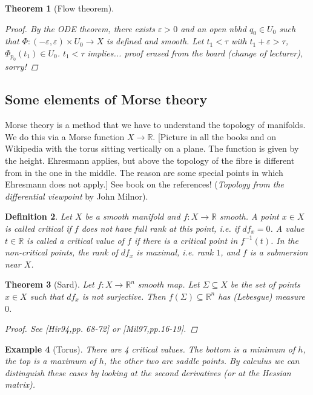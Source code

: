 \documentclass[12pt]{article}
\theoremstyle{darkgreentheorem}
\newtheorem{thm}{Theorem}[section]
\theoremstyle{darkbluedefinition}
\newtheorem{defn}[thm]{Definition}
\theoremstyle{darkredexample}
\newtheorem{exa}[thm]{Example}
\theoremstyle{remark}
\newcommand{\R}{\mathbb{R}}
\newcommand{\1}{\mathbbm{1}}
\newcommand{\tms}{\times}
\newcommand{\sub}{\subseteq}
\begin{document}
\begin{thm}[Flow theorem]
\begin{proof}
	By the ODE theorem, there exists $\varepsilon >0$ and an open nbhd $q_{0}\in U_{0}$ such that $\Phi\colon (-\varepsilon, \varepsilon)\tms U_{0}\to X$ is defined and smooth.
	Let $t_{1}<\tau$ with $t_{1}+\varepsilon >\tau$, $\Phi_{p_{0}}(t_{1})\in U_{0}$.
	$t_{1}<\tau$ implies... proof erased from the board (change of lecturer), sorry!
    \end{proof}
\end{thm}

\subsection{Some elements of Morse theory}

Morse theory is a method that we have to understand the topology of manifolds.
We do this via a Morse function $X\to \R$.
[Picture in all the books and on Wikipedia with the torus sitting vertically on a plane.
The function is given by the height.
Ehresmann applies, but above the topology of the fibre is different from in the one in the middle.
The reason are some special points in which Ehresmann does not apply.]
See book on the references! (\textit{Topology from the differential viewpoint} by John Milnor).

\begin{defn}
    Let $X$ be a smooth manifold and $f\colon X\to \R$ smooth.
    A point $x\in X$ is called \textit{critical} if $f$ does not have full rank at this point, i.e. if $df_{x}=0$.
    A value $t\in \R$ is called a \textit{critical value} of $f$ if there is a critical point in $f^{-1}(t)$.
    In the non-critical points, the rank of $df_{x}$ is maximal, i.e. rank $1$, and $f$ is a submersion near $X$.
\end{defn}

\begin{thm}[Sard]
    Let $f\colon X\to \R^{n}$ smooth map.
    Let $\Sigma\sub X$ be the set of points $x\in X$ such that $df_{x}$ is not surjective.
    Then $f(\Sigma)\sub \R^{n}$ has (Lebesgue) measure $0$.
    \begin{proof}
	See [Hir94,pp. 68-72] or [Mil97,pp.16-19].
    \end{proof}
\end{thm}

\begin{exa}[Torus]
    There are 4 critical values.
    The bottom is a minimum of $h$, the top is a maximum of $h$, the other two are saddle points.
    By calculus we can distinguish these cases by looking at the second derivatives (or at the Hessian matrix).
\end{exa}
\end{document}
